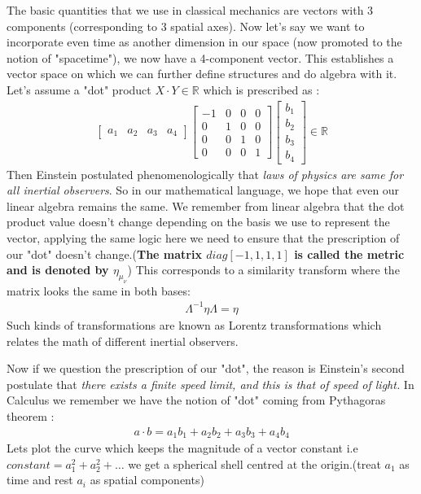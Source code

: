 \documentclass{article}
\begin{document}
The basic quantities that we use in classical mechanics are vectors with 3 components (corresponding to 3 spatial axes). Now let's say we want to incorporate even time as another dimension in our space (now promoted to the notion of "spacetime"), we now have a 4-component vector. This establishes a vector space on which we can further define structures and do algebra with it. Let's assume a "dot" product $X\cdot Y \in \mathbb{R}$ which is prescribed as :
\begin{align*}
\begin{bmatrix}
a_1&a_2&a_3&a_4
\end{bmatrix}
\begin{bmatrix}
-1 & 0   & 0   & 0   \\
0   & 1 & 0   & 0   \\
0   & 0   & 1 & 0   \\
0   & 0   & 0   & 1
\end{bmatrix}
\begin{bmatrix}
b_1 \\ b_2 \\ b_3 \\ b_4
\end{bmatrix} \in \mathbb{R}
\end{align*}
Then Einstein postulated phenomenologically that \textit{laws of physics are same for all inertial observers}.  So in our mathematical language, we hope that even our linear algebra remains the same. We remember from linear algebra that the dot product value doesn't change depending on the basis we use to represent the vector, applying the same logic here we need to ensure that the prescription of our "dot" doesn't change.(\textbf{The matrix $diag[-1,1,1,1]$ is called the metric and is denoted by  $\eta_\mu_\nu$})
This corresponds to a similarity transform where the matrix looks the same in both bases: 
\begin{align*}
    \Lambda^{-1} \eta \Lambda = \eta
\end{align*}
Such kinds of transformations are known as Lorentz transformations which relates the math of different inertial observers.

Now if we question the prescription of our "dot", the reason is Einstein's second postulate that \textit{there exists a finite speed limit, and this is that of speed of light.} In Calculus we remember we have the notion of "dot" coming from Pythagoras theorem : \begin{align*}
    a\cdot b = a_1b_1 + a_2b_2 + a_3b_3 + a_4b_4
\end{align*}
Lets plot the curve which keeps the magnitude of a vector constant i.e $constant = a_1^2 + a_2^2 +\dots$ we get a spherical shell centred at the origin.(treat $a_1$ as time and rest $a_i$ as spatial components)
\end{document}
